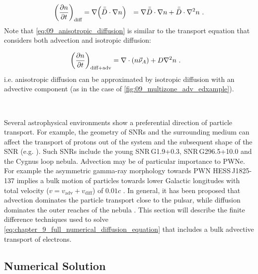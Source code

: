 \begin{equation}
    \begin{aligned}
        \qty(\pdv{n}{t})_\text{diff}&=\nabla\qty(\bar{\bar{D}}\cdot\nabla n)
        &=\nabla\bar{\bar{D}}\cdot\nabla n+\bar{\bar{D}}\cdot\nabla^2 n\text{ .} 
    \end{aligned} \label{eq:09_anisotropic_diffusion}
\end{equation}
 \noindent Note that \autoref{eq:09_anisotropic_diffusion} is similar to the transport equation that considers both advection and isotropic diffusion:

 \begin{equation}
     \begin{aligned}
         \qty(\pdv{n}{t})_\text{diff+adv}&=\nabla\cdot\qty(n\vec{\nu}_A)+D\nabla^2 n\text{ .} 
     \end{aligned}
 \end{equation}
\noindent i.e. anisotropic diffusion can be approximated by isotropic diffusion with an advective component (as in the case of \autoref{fig:09_multizone_adv_edxample}).
\par~\par 
Several astrophysical environments show a preferential direction of particle transport. For example, the geometry of SNRs and the surrounding medium can affect the transport of protons out of the system and the subsequent shape of the SNR (e.g. \cite{2015MNRAS.450.3080M,2021ApJ...923..233G}). Such SNRs include the young \mbox{SNR\,G1.9+0.3}, \mbox{SNR\,G296.5+10.0} and the Cygnus loop nebula. Advection may be of particular importance to PWNe. For example the asymmetric gamma-ray morphology towards PWN \mbox{HESS\,J1825-137} \citep{2019A&A...621A.116H} implies a bulk motion of particles towards lower Galactic longitudes with total velocity ($v=v_\text{adv}+v_\text{diff}$) of $0.01c$ \citep{2019A&A...621A.116H}. In general, it has been proposed that advection dominates the particle transport close to the pulsar, while diffusion dominates the outer reaches of the nebula \citep{2020A&A...636A.113G,2021PhRvD.104l3017R}. This section will describe the finite difference techniques used to solve \autoref{eq:chapter_9_full_numerical_diffusion_equation} that includes a bulk advective transport of electrons.

\subsection{Numerical Solution} \label{sec:09_multizone_advection_num_sol}

